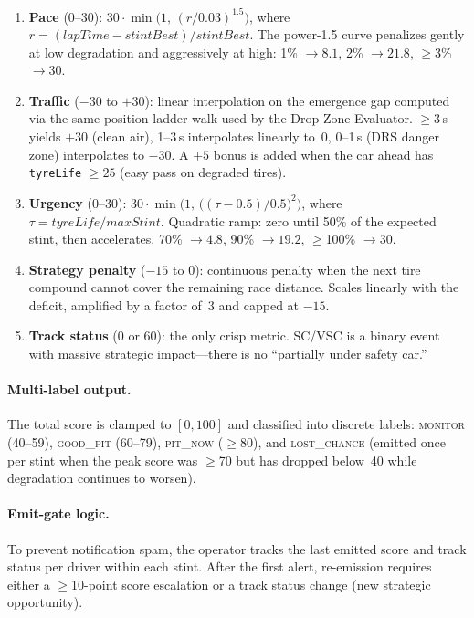 \documentclass[a4paper,twocolumn]{article}
\begin{document}
\begin{enumerate}
  \item \textbf{Pace} ($0$--$30$): $30 \cdot \min\!\big(1,\, (r / 0.03)^{1.5}\big)$,
    where $r = (\mathit{lapTime} - \mathit{stintBest}) / \mathit{stintBest}$.
    The power-1.5 curve penalizes gently at low degradation and
    aggressively at high: 1\% $\to 8.1$, 2\% $\to 21.8$,
    $\geq$3\% $\to 30$.
  \item \textbf{Traffic} ($-30$ to $+30$): linear interpolation on the
    emergence gap computed via the same position-ladder walk used by the
    Drop Zone Evaluator. $\geq$3\,s yields $+30$ (clean air), 1--3\,s
    interpolates linearly to~0, 0--1\,s (DRS danger zone) interpolates
    to $-30$. A $+5$ bonus is added when the car ahead has
    \texttt{tyreLife} $\geq 25$ (easy pass on degraded tires).
  \item \textbf{Urgency} ($0$--$30$): $30 \cdot \min\!\big(1,\,
    \big((\tau - 0.5) / 0.5\big)^{2}\big)$, where
    $\tau = \mathit{tyreLife} / \mathit{maxStint}$. Quadratic ramp:
    zero until 50\% of the expected stint, then accelerates. 70\%
    $\to 4.8$, 90\% $\to 19.2$, $\geq$100\% $\to 30$.
  \item \textbf{Strategy penalty} ($-15$ to $0$): continuous penalty
    when the next tire compound cannot cover the remaining race
    distance. Scales linearly with the deficit, amplified by a factor
    of~3 and capped at $-15$.
  \item \textbf{Track status} ($0$ or $60$): the only crisp metric.
    SC/VSC is a binary event with massive strategic impact---there is
    no ``partially under safety car.''
\end{enumerate}

\paragraph{Multi-label output.}
The total score is clamped to $[0, 100]$ and classified into discrete
labels: \textsc{monitor} (40--59), \textsc{good\_pit} (60--79),
\textsc{pit\_now} ($\geq$80), and \textsc{lost\_chance} (emitted once
per stint when the peak score was $\geq$70 but has dropped below~40
while degradation continues to worsen).

\paragraph{Emit-gate logic.}
To prevent notification spam, the operator tracks the last emitted
score and track status per driver within each stint. After the first
alert, re-emission requires either a $\geq$10-point score escalation
or a track status change (new strategic opportunity).
\end{document}
